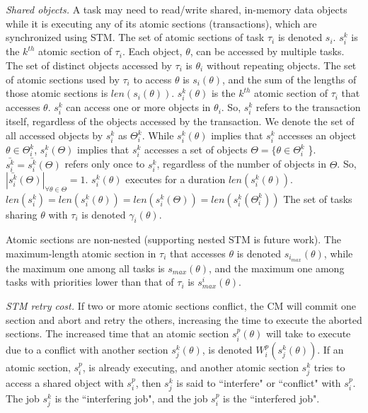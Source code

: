 \documentclass[a4paper,english]{article}
\begin{document}
\textit{Shared objects.}
 A task may need to read/write shared, in-memory data objects while it is executing any of its atomic sections (transactions), which are synchronized using STM. 
The set of atomic sections of task $\tau_i$ is denoted $s_i$. $s_i^k$ is the $k^{th}$ atomic section of $\tau_i$. 
Each object, $\theta$, can be accessed by multiple tasks. The set of distinct objects accessed by $\tau_i$ is $\theta_i$ without repeating objects.
The set of atomic sections used by $\tau_i$ to access $\theta$ is $s_i(\theta)$, and the sum of the lengths of those atomic sections is $len(s_i(\theta))$. $s_i^k(\theta)$ is the $k^{th}$ atomic section of $\tau_i$ that accesses $\theta$.
%
 $s_i^k$ can access one or more objects in $\theta_i$. So, $s_i^k$ refers to the transaction itself, regardless of the objects accessed by the transaction. We denote the set of all accessed objects by $s_i^k$ as $\Theta_i^k$. While $s_i^k(\theta)$ implies that $s_i^k$ accesses an object $\theta \in \Theta_i^k$, $s_i^k(\Theta)$ implies that $s_i^k$ accesses a set of objects $\Theta=\{\theta \in \Theta_i^k$ \}. $\bar{s_i^k}=\bar{s_i^k}(\Theta)$ refers only once to $s_i^k$, regardless of the number of objects in $\Theta$. So, $|\bar{s_i^k}(\Theta)|_{\forall \theta \in \Theta}=1$.
%
 $s_i^k(\theta)$  executes for a duration $len(s_i^k(\theta))$. $len(s_i^k)=len(s_i^k(\theta))=len(s_i^k(\Theta))=len(s_i^k(\Theta_i^k))$ The set of tasks sharing $\theta$ with $\tau_i$ is denoted $\gamma_i(\theta)$. 

Atomic sections are non-nested (supporting nested STM is future work). The maximum-length atomic section in $\tau_i$ that accesses $\theta$ is denoted $s_{i_{max}} (\theta)$, while the maximum one among all tasks is $s_{max} (\theta)$, and the maximum one among tasks with priorities lower than that of $\tau_i$ is $s_{max}^i (\theta)$.

\textit{STM retry cost.} If two or more atomic sections conflict, the CM will commit one section and abort and retry the others, increasing the time to execute the aborted sections. The increased time that an atomic section $s_i^p (\theta)$ will take to execute due to a conflict with another section $s_j^k (\theta)$, is denoted $W_{i}^{p}(s_{j}^{k}(\theta))$. If an atomic section, $s_i^p$, is already executing, and another atomic section $s_j^k$ tries to access a shared object with $s_i^p$, then $s_j^k$ is said to ``interfere" or ``conflict" with $s_i^p$. The job $s_j^k$ is the ``interfering job", and the job $s_i^p$ is the ``interfered job".
\end{document}
